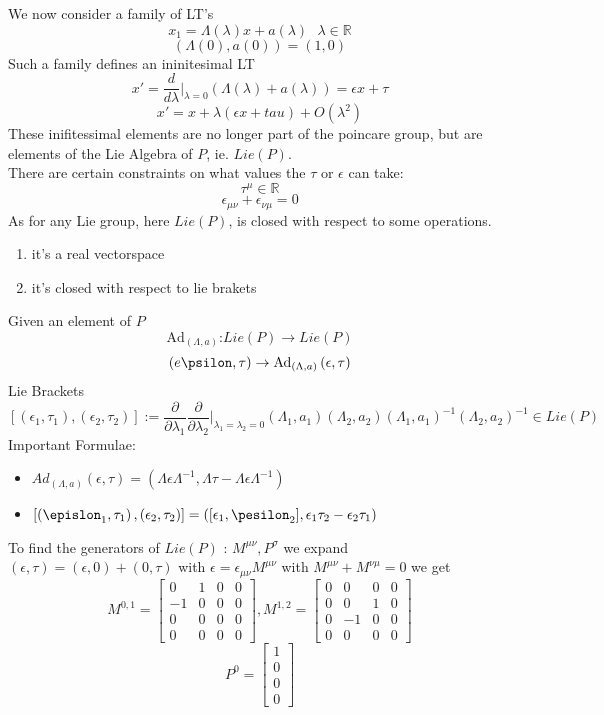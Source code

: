 \documentclass{report}
\begin{document}
We now consider a family of LT's \[
  x_1 = \Lambda(\lambda) x + a(\lambda) \text{    } \lambda \in \mathbb{R}
\] \[
\left( \Lambda(0), a(0) \right) = \left( 1,0 \right) 
\] Such a family defines an ininitesimal LT \[
x' = \frac{d}{d\lambda}|_{\lambda=0} \left( \Lambda(\lambda) + a(\lambda) \right) = \epsilon x + \tau
\] \[
x' = x + \lambda\left( \epsilon x + tau \right) + O(\lambda^2)
\] 
These inifitessimal elements are no longer part of the poincare group, but are elements of the Lie Algebra of $P$, ie. $Lie(P)$.\\
There are certain constraints on what values the $\tau$ or $\epsilon$ can take:\[
  \tau^\mu \in \mathbb{R}
\] \[
\epsilon_{\mu\nu} + \epsilon_{\nu\mu} = 0
\] 
As for any Lie group, here $Lie(P)$, is closed with respect to some operations.
\begin{enumerate}
  \item it's a real vectorspace
  \item it's closed with respect to lie brakets
\end{enumerate}
Given an element of $P$ \[
  \text{Ad}_{\left( \Lambda, a \right) }\text{:} Lie(P) \to Lie(P)
\] \[
\left( e\psilon, \tau \right) \to \text{Ad}_{\left( \Lambda, a \right) } \left( \epsilon, \tau \right) 
\] 
Lie Brackets \[
  [\left( \epsilon_1, \tau_1 \right) , \left( \epsilon_2, \tau_2 \right)] := \frac{\partial }{\partial\lambda_1 } \frac{\partial }{\partial \lambda_2 } |_{\lambda_1 = \lambda_2 = 0} \left( \Lambda_1, a_1 \right) \left( \Lambda_2, a_2 \right) \left( \Lambda_1, a_1 \right) ^{-1} \left( \Lambda_2,a_2 \right) ^{-1} \in Lie(P) 
\] 
Important Formulae:
\begin{itemize}
  \item $Ad_{\left( \Lambda, a \right) } \left( \epsilon, \tau \right) = ( \Lambda \epsilon \Lambda^{-1}, \Lambda\tau - \Lambda \epsilon \Lambda^{-1}) $ 
  \item $[\left( \epislon_1, \tau_1 \right), \left( \epsilon_2, \tau_2 \right) ] = \left( [\epsilon_1, \pesilon_2], \epsilon_1 \tau_2 - \epsilon_2 \tau_1 \right)   $
\end{itemize}
To find the generators of $Lie(P)$ : $M^{\mu\nu}, P^\sigma$ we expand $\left( \epsilon, \tau \right) = \left( \epsilon, 0 \right) + \left( 0, \tau \right)   $ with $\epsilon = \epsilon_{\mu\nu} M^{\mu\nu}$ with $M^{\mu\nu} + M^{\nu\mu} = 0$ we get \[
  M^{0,1} = \begin{bmatrix}  0 & 1 & 0 & 0 \\ -1 & 0 &0 &0 \\ 0& 0& 0&0 \\ 0&0&0&0 \end{bmatrix} 
  , M^{1,2} = \begin{bmatrix} 0&0&0&0 \\ 0&0&1&0 \\ 0&-1&0&0 \\ 0&0&0&0 \end{bmatrix} 
\]   \[
P^0 = \begin{bmatrix} 1\\0\\0\\0 \end{bmatrix} 
\] 
\end{document}
